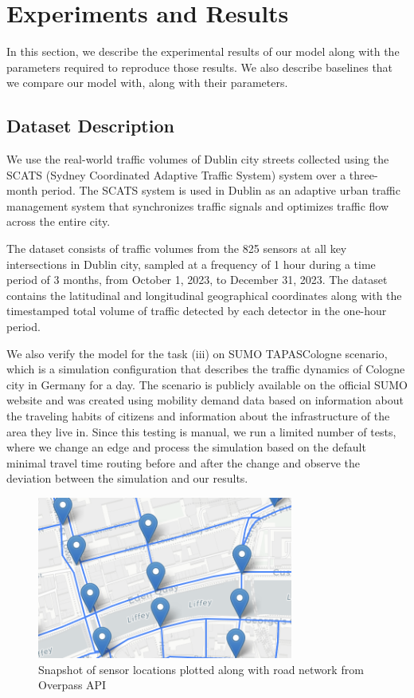 \chapter{Experiments and Results} \label{chap3}

In this section, we describe the experimental results of our model along with the parameters required to reproduce those results. We also describe baselines that we compare our model with, along with their parameters.

\section{Dataset Description}

We use the real-world traffic volumes of Dublin city streets collected using the SCATS (Sydney Coordinated Adaptive Traffic System)\cite{scats} system over a three-month period. The SCATS system is used in Dublin as an adaptive urban traffic management system that synchronizes traffic signals and optimizes traffic flow across the entire city.

The dataset consists of traffic volumes from the 825 sensors at all key intersections in Dublin city, sampled at a frequency of 1 hour during a time period of 3 months, from October 1, 2023, to December 31, 2023. The dataset contains the latitudinal and longitudinal geographical coordinates along with the timestamped total volume of traffic detected by each detector in the one-hour period.

We also verify the model for the task (iii) on SUMO\cite{sumo} TAPASCologne scenario\cite{tapas}, which is a simulation configuration that describes the traffic dynamics of Cologne city in Germany for a day. The scenario is publicly available on the official SUMO website and was created using mobility demand data based on information about the traveling habits of citizens and information about the infrastructure of the area they live in. Since this testing is manual, we run a limited number of tests, where we change an edge and process the simulation based on the default minimal travel time routing before and after the change and observe the deviation between the simulation and our results.

\begin{figure}[htbp]
  \centering
  \includegraphics[width=0.75\textwidth]{dataset.png}
  \caption{Snapshot of sensor locations plotted along with road network from Overpass API}
  \label{fig:dataset}
\end{figure}


